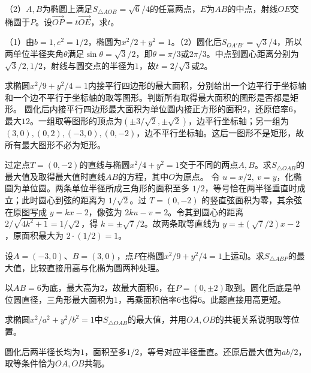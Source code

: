 （2）\(A,B\)为椭圆上满足\(S_{\triangle AOB}=\sqrt6/4\)的任意两点，\(E\)为\(AB\)的中点，射线\(OE\)交椭圆于\(P\)。设\(\overrightarrow{OP}=t\overrightarrow{OE}\)，求\(t\)。
\par
\solutionanswer
（1）由\(b=1,e^2=1/2\)，椭圆为\(x^2/2+y^2=1\)。（2）圆化后\(S_{OA'B'}=\sqrt3/4\)，所以两单位半径夹角\(\theta\)满足\(\sin\theta=\sqrt3/2\)，即\(\theta=\pi/3\)或\(2\pi/3\)。中点到圆心距离分别为\(\sqrt3/2,1/2\)，射线与圆交点的半径为\(1\)，故\(t=2/\sqrt3\)或\(2\)。


求椭圆\(x^2/9+y^2/4=1\)内接平行四边形的最大面积，分别给出一个边平行于坐标轴和一个边不平行于坐标轴的取等图形。判断所有取得最大面积的图形是否都是矩形。
\solutionanswer
圆化后内接平行四边形最大面积为单位圆内接正方形的面积\(2\)，还原倍率\(6\)，最大\(12\)。一组取等图形的顶点为\((\pm3/\sqrt2,\pm\sqrt2)\)，边平行坐标轴；另一组为\((3,0),(0,2),(-3,0),(0,-2)\)，边不平行坐标轴。这后一图形不是矩形，故所有最大图形不必为矩形。


过定点\(T=(0,-2)\)的直线与椭圆\(x^2/4+y^2=1\)交于不同的两点\(A,B\)。求\(S_{\triangle OAB}\)的最大值及取得最大值时直线\(AB\)的方程，其中\(O\)为原点。
\solutionanswer
令 \(u=x/2,\ v=y\)，化椭圆为单位圆。两条单位半径所成三角形的面积至多 \(1/2\)，等号恰在两半径垂直时成立；此时圆心到弦的距离为 \(1/\sqrt2\)。过 \(T=(0,-2)\) 的竖直弦面积为零，其余弦在原图写成 \(y=kx-2\)，像弦为 \(2ku-v=2\)。令其到圆心的距离 \(2/\sqrt{4k^2+1}=1/\sqrt2\)，得 \(k=\pm\sqrt7/2\)。故两条取等直线为 \(y=\pm(\sqrt7/2)x-2\)，原面积最大为 \(2\cdot(1/2)=1\)。


设\(A=(-3,0)\)、\(B=(3,0)\)，点\(P\)在椭圆\(x^2/9+y^2/4=1\)上运动。求\(S_{\triangle ABP}\)的最大值，比较直接用高与化椭为圆两种处理。
\par
\solutionanswer
以\(AB=6\)为底，最大高为\(2\)，故最大面积\(6\)，在\(P=(0,\pm2)\)取到。圆化后底是单位圆直径，三角形最大面积为\(1\)，再乘面积倍率\(6\)也得\(6\)。此题直接用高更短。


求椭圆\(x^2/a^2+y^2/b^2=1\)中\(S_{\triangle OAB}\)的最大值，并用\(OA,OB\)的共轭关系说明取等位置。
\par
\solutionanswer
圆化后两半径长均为\(1\)，面积至多\(1/2\)，等号对应半径垂直。还原后最大值为\(ab/2\)，取等条件恰为\(OA,OB\)共轭。


